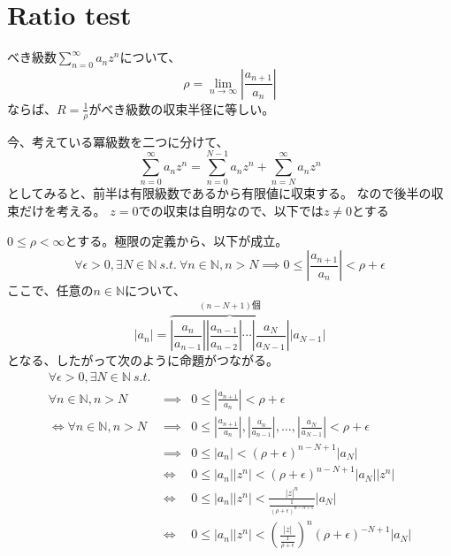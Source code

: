 \documentclass[a4paper]{jarticle}
\begin{document}
    \section{Ratio test}
        \begin{Them}
        べき級数$\sum_{n=0}^\infty{a_n}z^n$について、
        \[
            \rho = \lim_{n \to \infty} \left| \frac{a_{n+1}}{a_n} \right|
        \]
        ならば、$R=\frac{1}{\rho}$がべき級数の収束半径に等しい。
        \end{Them}

        \begin{Proof}
            今、考えている冪級数を二つに分けて、
            \[
                \sum_{n=0}^\infty{a_n z^n}=\sum_{n=0}^{N-1}{a_n z^n}+\sum_{n=N}^{\infty}{a_n z^n}
            \]
            としてみると、前半は有限級数であるから有限値に収束する。
            なので後半の収束だけを考える。
            $z=0$での収束は自明なので、以下では$z \neq 0$とする

            $0 \leq \rho < \infty$とする。極限の定義から、以下が成立。
            \[
                \forall \epsilon>0, \exists N \in \mathbb{N}
                ~s.t.~ \forall n \in \mathbb{N}, n>N \implies 0 \leq \left| \frac{a_{n+1}}{a_n} \right| < \rho + \epsilon
            \]
            ここで、任意の$n \in \mathbb{N}$について、
            \[
                |a_n|
                = \overbrace
                {
                    \left|\frac{a_{n}}{a_{n-1}}\right| \left|\frac{a_{n-1}}{a_{n-2}}\right| \cdots \left|\frac{a_{N}}{a_{N-1}}\right|
                }^{ (n-N+1)個 } |a_{N-1}|
            \]
            となる、したがって次のように命題がつながる。
            \begin{eqnarray*}
                \forall \epsilon>0, \exists N \in \mathbb{N} ~s.t.~ \\
                \forall n \in \mathbb{N}, n>N &\implies& 0 \leq \left| \frac{a_{n+1}}{a_{n}} \right| < \rho + \epsilon \\
                \iff \forall n \in \mathbb{N}, n>N &\implies&
                    0 \leq
                        \left| \frac{a_{n+1}}{a_{n}} \right|,
                        \left| \frac{a_{n}}{a_{n-1}} \right|,
                        \dots,
                        \left| \frac{a_{N}}{a_{N-1}} \right|
                    < \rho + \epsilon \\
                &\implies&  0 \leq |a_n|< (\rho+\epsilon)^{n-N+1}|a_N| \\
                &\iff&      0 \leq |a_n||z^n|< (\rho+\epsilon)^{n-N+1}|a_N| |z^n| \\
                &\iff&      0 \leq |a_n||z^n|< \frac{|z|^n}{\frac{1}{(\rho+\epsilon)^{n-N+1}}}|a_N| \\
                &\iff&      0 \leq |a_n||z^n|< \left( \frac{|z|}{\frac{1}{\rho+\epsilon}} \right)^{n} (\rho+\epsilon)^{-N+1} |a_N| \\
            \end{eqnarray*}


\end{Proof}
\end{document}
